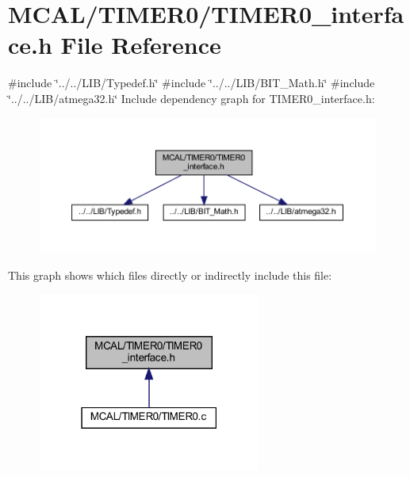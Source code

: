\section{M\+C\+A\+L/\+T\+I\+M\+E\+R0/\+T\+I\+M\+E\+R0\+\_\+interface.h File Reference}
\label{_t_i_m_e_r0__interface_8h}
{\ttfamily \#include \char`\"{}../../\+L\+I\+B/\+Typedef.\+h\char`\"{}}\newline
{\ttfamily \#include \char`\"{}../../\+L\+I\+B/\+B\+I\+T\+\_\+\+Math.\+h\char`\"{}}\newline
{\ttfamily \#include \char`\"{}../../\+L\+I\+B/atmega32.\+h\char`\"{}}\newline
Include dependency graph for T\+I\+M\+E\+R0\+\_\+interface.\+h\+:\nopagebreak
\begin{figure}[H]
\begin{center}
\leavevmode
\includegraphics[width=350pt]{_t_i_m_e_r0__interface_8h__incl}
\end{center}
\end{figure}
This graph shows which files directly or indirectly include this file\+:\nopagebreak
\begin{figure}[H]
\begin{center}
\leavevmode
\includegraphics[width=207pt]{_t_i_m_e_r0__interface_8h__dep__incl}
\end{center}
\end{figure}

